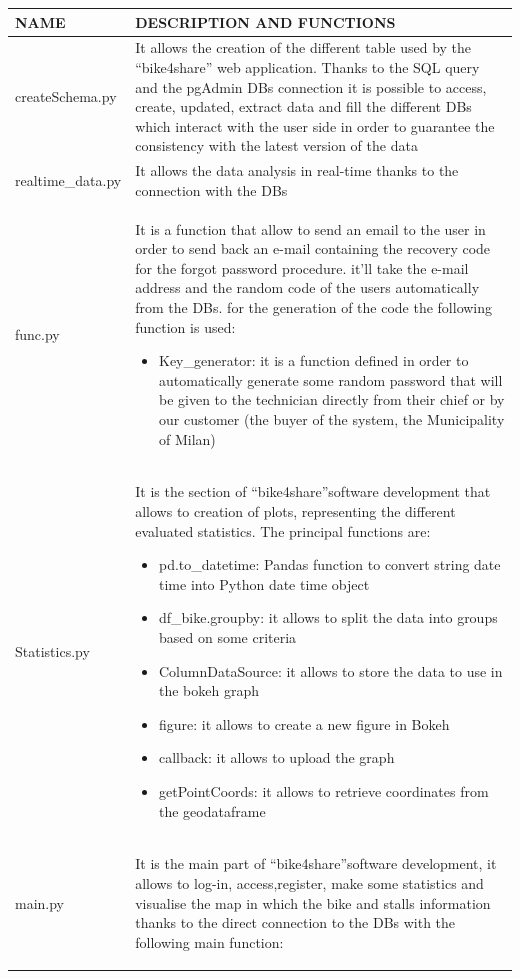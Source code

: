 \documentclass{article}
\begin{document}
    \begin{longtable}[H]{|l|p{}|} 
  
    \hline
    NAME      &         DESCRIPTION AND FUNCTIONS
      \\
      \hline
    createSchema.py &  It allows the creation of the different table used by the  “bike4share” web application. Thanks to the SQL query and the pgAdmin DBs connection it is possible to access, create, updated, extract data and fill the different DBs which interact with the user side in order to guarantee the consistency with the latest version of the data
      \\
    \hline 
    realtime\_data.py & It allows the data analysis in real-time thanks to the connection with the DBs
    \\
    
    \hline
    func.py & It is a function that allow to send an email to the user in order to send back an e-mail containing the recovery code for the forgot password procedure. it'll take the e-mail address and the random code of the users automatically from the DBs. for the generation of the code the following function is used:
      \begin{itemize}
         \item Key\_generator: it is a function defined in order to automatically generate some random password that will be given to the technician directly from their chief or by our customer (the buyer of the system, the Municipality of Milan)
    \end{itemize}
    \\
    \hline 
   Statistics.py & It is the section of “bike4share”software development that  allows to creation of plots, representing the different evaluated statistics. The principal functions are:
     \begin{itemize}
          \item pd.to\_datetime: Pandas function to convert string date time into Python date time object
          \item df\_bike.groupby: it allows to split the data into groups based on some criteria
          \item ColumnDataSource: it allows to store the data to use in the bokeh graph
          \item figure: it allows to create a new figure in Bokeh
          \item callback: it allows to upload the graph
          \item getPointCoords: it allows to retrieve coordinates from the geodataframe 
     \end{itemize}
       \\
    \hline
    main.py & It is the main part of “bike4share”software development, it allows to log-in, access,register, make some statistics and visualise the map in which the bike and stalls information thanks to the direct connection to the DBs with the following main function:
     \begin{itemize}
     

\end{itemize}
\end{longtable}
\end{document}
